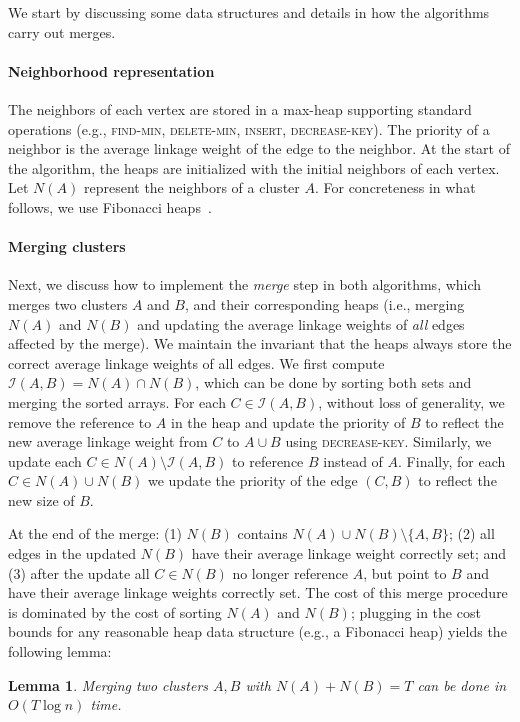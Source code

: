 \documentclass[11pt]{article}
\newtheorem{lemma}{Lemma}
\begin{document}
We start by discussing some data structures and details in how the algorithms carry out merges.

\paragraph{Neighborhood representation}
The neighbors of each vertex are stored in a max-heap supporting standard operations (e.g., \textsc{find-min}, \textsc{delete-min}, \textsc{insert}, \textsc{decrease-key}).
The priority of a neighbor is the average linkage weight of the edge to the neighbor.
At the start of the algorithm, the heaps are initialized with the initial neighbors of each vertex.
Let $N(A)$ represent the neighbors of a cluster $A$.
For concreteness in what follows, we use Fibonacci heaps~\cite{CLRS, fredman1987fibonacci}.


\paragraph{Merging clusters}
Next, we discuss how to implement the {\em merge} step in both algorithms, which merges two clusters $A$ and $B$, and their corresponding heaps (i.e., merging $N(A)$ and $N(B)$ and updating the average linkage weights of {\em all} edges affected by the merge).
We maintain the invariant that the heaps always store the correct average linkage weights of all edges.
We first compute $\mathcal{I}(A,B) = N(A) \cap N(B)$, which can be done by sorting both sets and merging the sorted arrays.
For each $C \in \mathcal{I}(A, B)$, without loss of generality, we remove the reference to $A$ in the heap and update the priority of $B$ to reflect the new average linkage weight from $C$ to $A \cup B$ using \textsc{decrease-key}.
Similarly, we update each $C \in N(A) \setminus \mathcal{I}(A, B)$ to reference $B$ instead of $A$.
Finally, for each $C \in N(A) \cup N(B)$ we update the priority of the edge $(C, B)$ to reflect the new size of $B$.

At the end of the merge: (1) $N(B)$ contains $N(A) \cup N(B) \setminus \{A, B\}$; (2) all edges in the updated $N(B)$ have their average linkage weight correctly set; and (3) after the update all $C \in N(B)$ no longer reference $A$, but point to $B$ and have their average linkage weights correctly set.
%
The cost of this merge procedure is dominated by the cost of sorting $N(A)$ and $N(B)$; plugging in the cost bounds for any reasonable heap data structure (e.g., a Fibonacci heap) yields the following lemma:
\begin{lemma}\label{lem:merge}
Merging two clusters $A,B$ with $N(A) + N(B) = T$ can be done in $O(T \log n)$ time.
\end{lemma}
\end{document}
